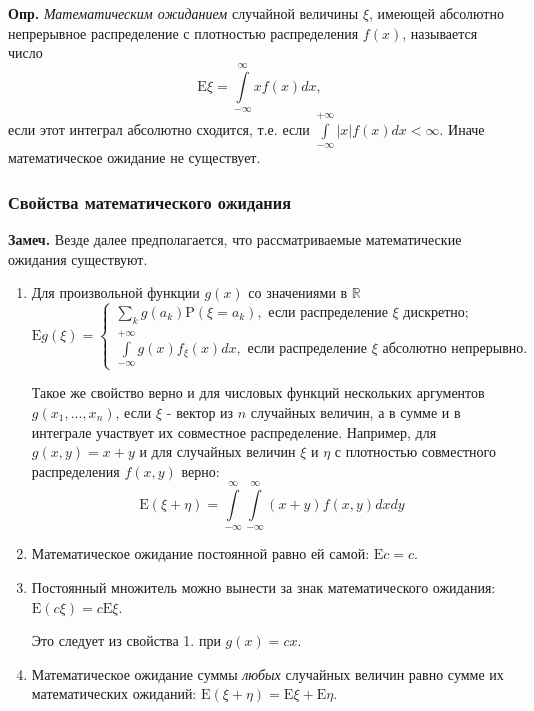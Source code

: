 \documentclass[oneside,final,14pt]{extreport}
\newcommand\mydef{{\bf Опр.}}
\newcommand\mynote{{\bf Замеч.}}
\theoremstyle{definition}
\begin{document}
\mydef{} {\it Математическим ожиданием} случайной величины $\xi$, имеющей абсолютно непрерывное распределение с плотностью распределения $f(x)$, называется число
$$\mathrm{E} \xi=\int\limits_{-\infty}^{\infty} x f(x) dx,$$
если этот интеграл абсолютно сходится, т.е. если $\int\limits_{-\infty}^{+\infty}|x|f(x)dx < \infty.$ Иначе математическое ожидание не существует.

\subsubsection{Свойства математического ожидания}
\mynote{} Везде далее предполагается, что рассматриваемые математические ожидания существуют.
\begin{enumerate}
    \item Для произвольной функции $g(x)$ со значениями в $\mathbb{R}$
    $$\mathrm{E} g(\xi)=\left\{\begin{array}{l}\sum\limits_{k} g\left(a_{k}\right) \mathrm{P}\left(\xi=a_{k}\right), \text { если распределение } \xi \text { дискретно; } \\ \int\limits_{-\infty}^{+\infty} g(x) f_{\xi}(x) d x, \text { если распределение } \xi \text { абсолютно непрерывно. }\end{array}\right.$$
    
    Такое же свойство верно и для числовых функций нескольких аргументов $g(x_1, ...,x_n)$, если $\xi$ - вектор из $n$ случайных величин, а в сумме и в интеграле участвует их совместное распределение. Например, для $g(x,y) = x + y$ и для случайных величин $\xi$ и $\eta$ с плотностью совместного распределения $f(x,y)$ верно: 
    \begin{equation}
        \mathrm{E}(\xi+\eta)=\int\limits_{-\infty}^{\infty} \int\limits_{-\infty}^{\infty}(x+y) f(x, y) d x d y
    \end{equation}
    
    \item Математическое ожидание постоянной равно ей самой: $\mathrm{E} c=c.$
    \item Постоянный множитель можно вынести за знак математического ожидания: $\mathrm{E}(c\xi) = c\mathrm{E}\xi.$
    
    Это следует из свойства 1. при $g(x) = cx$.
    \item Математическое ожидание суммы {\it любых} случайных величин равно сумме их математических ожиданий: $\mathrm{E}(\xi + \eta) = \mathrm{E}\xi + \mathrm{E}\eta.$
    

\end{enumerate}
\end{document}
